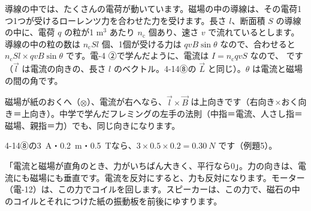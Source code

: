 \label{ph:電-6:sec8}
導線の中では、たくさんの電荷が動いています。磁場の中の導線は、その電荷1つ1つが受けるローレンツ力を合わせた力を受けます。長さ $l$、断面積 $S$ の導線の中に、電荷 $q$ の粒が1 m$^3$ あたり $n_{\mathrm c}$ 個あり、速さ $v$ で流れているとします。導線の中の粒の数は $n_{\mathrm c}Sl$ 個、1個が受ける力は $qvB\sin\theta$ なので、合わせると $n_{\mathrm c}Sl\times qvB\sin\theta$ です。電-4 ②で学んだように、電流は $I=n_{\mathrm c}qvS$ なので、
\label{ph:電-6:force}です（$\vec l$ は電流の向きの、長さ $l$ のベクトル。4-14⑧の $\vec L$ と同じ）。$\theta$ は電流と磁場の間の角です。

\noindent\begin{minipage}[c]{0.46\linewidth}\centering
{}
\label{ph:電-6:fig-force}
\end{minipage}\hfill
\begin{minipage}[c]{0.51\linewidth}\raggedright
磁場が紙のおくへ（$\otimes$）、電流が右へなら、$\vec l\times\vec B$ は上向きです（右向き×おく向き＝上向き）。中学で学んだフレミングの左手の法則（中指＝電流、人さし指＝磁場、親指＝力）でも、同じ向きになります。\par\vspace{2pt}
4-14⑧の\qty{3}{A}・\qty{0.2}{m}・\qty{0.5}{T}なら、$3\times0.5\times0.2=\qty{0.30}{N}$ です（例題5）。
\end{minipage}

\par\vspace{4pt}
\begin{phyomi}[$F=IBl\sin\theta$]
「電流と磁場が直角のとき、力がいちばん大きく、平行なら0」。力の向きは、電流にも磁場にも垂直です。電流を反対にすると、力も反対になります。モーター（電-12）は、この力でコイルを回します。スピーカーは、この力で、磁石の中のコイルとそれにつけた紙の振動板を前後にゆすります。
\end{phyomi}

